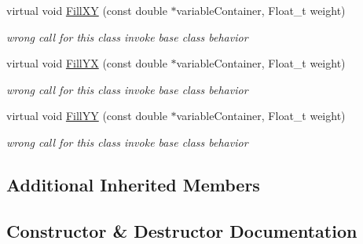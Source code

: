 \begin{DoxyCompactItemize}
virtual void \mbox{\hyperlink{classQn_1_1CorrectionProfileCorrelationComponentsHarmonics_a59fc7f772621466f60cbf34a98c0174c}{Fill\+XY}} (const double $\ast$variable\+Container, Float\+\_\+t weight)
\begin{DoxyCompactList}\small\item\em wrong call for this class invoke base class behavior \end{DoxyCompactList}\item 
\mbox{\label{classQn_1_1CorrectionProfileCorrelationComponentsHarmonics_a04d5ba4313e4ebab81ffe203970c8cf3}} 
virtual void \mbox{\hyperlink{classQn_1_1CorrectionProfileCorrelationComponentsHarmonics_a04d5ba4313e4ebab81ffe203970c8cf3}{Fill\+YX}} (const double $\ast$variable\+Container, Float\+\_\+t weight)
\begin{DoxyCompactList}\small\item\em wrong call for this class invoke base class behavior \end{DoxyCompactList}\item 
\mbox{\label{classQn_1_1CorrectionProfileCorrelationComponentsHarmonics_a2616f4bc573bb7d8cd3ff69d7f0b5e12}} 
virtual void \mbox{\hyperlink{classQn_1_1CorrectionProfileCorrelationComponentsHarmonics_a2616f4bc573bb7d8cd3ff69d7f0b5e12}{Fill\+YY}} (const double $\ast$variable\+Container, Float\+\_\+t weight)
\begin{DoxyCompactList}\small\item\em wrong call for this class invoke base class behavior \end{DoxyCompactList}\end{DoxyCompactItemize}
\subsection*{Additional Inherited Members}


\subsection{Constructor \& Destructor Documentation}
\mbox{\label{classQn_1_1CorrectionProfileCorrelationComponentsHarmonics_a87efcaa6fb3a2e3bf1296bafc977aa3d}} 

